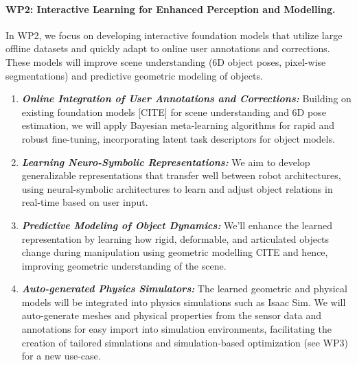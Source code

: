 \begin{refsection}
\paragraph{WP2: Interactive Learning for Enhanced Perception and Modelling.} In WP2, we focus on developing interactive foundation models that utilize large offline datasets and quickly adapt to online user annotations and corrections. These models will improve scene understanding (6D object poses, pixel-wise segmentations) and predictive geometric modeling of objects.
\begin{enumerate}[noitemsep, topsep=0pt, partopsep=0pt, label=\alph*), leftmargin=0em, itemindent=1em, labelindent=1em, labelwidth=*]
\item \textit{\textbf{Online Integration of User Annotations and Corrections:}} Building on existing foundation models [CITE] for scene understanding and 6D pose estimation, we will apply Bayesian meta-learning algorithms for rapid and robust fine-tuning, incorporating latent task descriptors for object models. 
\item \textit{\textbf{Learning Neuro-Symbolic Representations:}} We aim to develop generalizable representations that transfer well between robot architectures, using neural-symbolic architectures to learn and adjust object relations in real-time based on user input. 
\item \textit{\textbf{ Predictive Modeling of Object Dynamics:}} We'll enhance the learned representation by learning how rigid, deformable, and articulated objects change during manipulation using geometric modelling CITE and hence, improving geometric understanding of the scene. 
\item  \textit{\textbf{ Auto-generated Physics Simulators:}} The learned geometric and physical models will be integrated into physics simulations such as Isaac Sim. We will auto-generate meshes and physical properties from the sensor data and  annotations for easy import into simulation environments, facilitating the creation of tailored simulations and simulation-based optimization (see WP3) for a new use-case.
\end{enumerate}
\vspace{-0.3cm}

\end{refsection}
